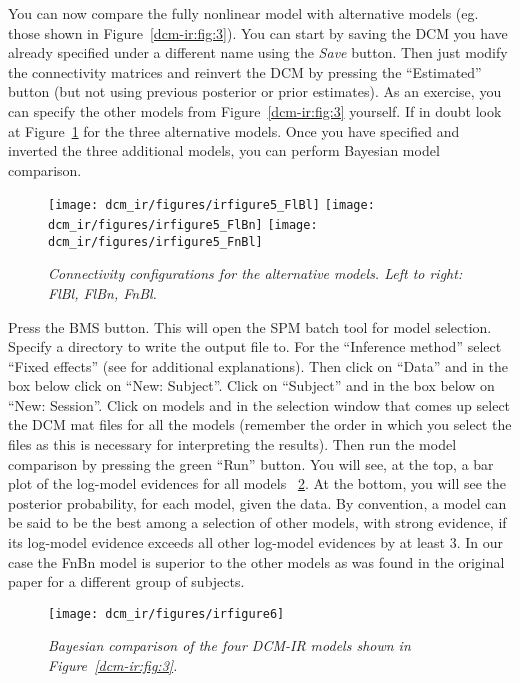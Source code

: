You can now compare the fully nonlinear model with alternative models (eg. those shown in Figure~\ref{dcm-ir:fig:3}). You can start by saving the DCM you have already specified under a different name using the \textit{Save} button. Then just modify the connectivity matrices and reinvert the DCM by pressing the ``Estimated'' button (but not using previous posterior or prior estimates). As an exercise, you can specify the other models from Figure~\ref{dcm-ir:fig:3} yourself. If in doubt look at Figure~\ref{dcm-ir:fig:5} for the three alternative models. Once you have specified and inverted the three additional models, you can perform Bayesian model comparison. 

\begin{figure}
\begin{center}
\texttt{[image: dcm\_ir/figures/irfigure5\_FlBl]}
\texttt{[image: dcm\_ir/figures/irfigure5\_FlBn]}
\texttt{[image: dcm\_ir/figures/irfigure5\_FnBl]}
\caption{\em Connectivity configurations for the alternative models. Left to right: FlBl, FlBn, FnBl. \label{dcm-ir:fig:5}}
\end{center}
\end{figure}

Press the \textsc{BMS} button. This will open the SPM batch tool for model selection. Specify a directory to write the output file to.  For the ``Inference method'' select ``Fixed effects'' (see \cite{klaas_bms} for additional explanations). Then click on ``Data'' and in the box below click on ``New: Subject''. Click on ``Subject'' and in the box below on ``New: Session''. Click on models and in the selection window that comes up select the DCM mat files for all the models (remember the order in which you select the files as this is necessary for interpreting the results). Then run the model comparison by pressing the green ``Run'' button. You will see, at the top, a bar plot of the log-model evidences for all models ~\ref{dcm-ir:fig:6}. At the bottom, you will see the posterior probability, for each model, given the data. By convention, a model can be said to be the best among a selection of other models, with strong evidence, if its log-model evidence exceeds all other log-model evidences by at least 3. In our case the FnBn model is superior to the other models as was found in the original paper \cite{cc_asymm} for a different group of subjects. 

\begin{figure}
\begin{center}
\texttt{[image: dcm\_ir/figures/irfigure6]}
\caption{\em Bayesian comparison of the four DCM-IR models shown in Figure~\ref{dcm-ir:fig:3}.\label{dcm-ir:fig:6}}
\end{center}
\end{figure}
